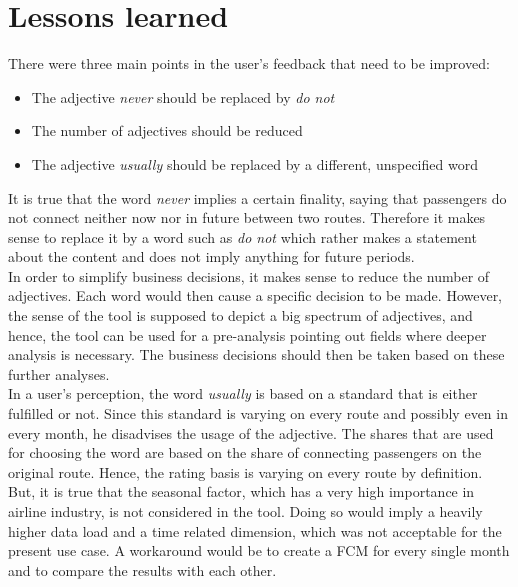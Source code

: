 \documentclass[conference]{IEEEtran}
\begin{document}
\section{Lessons learned}
\label{sec:lessons}
There were three main points in the user's feedback that need to be improved:
\begin{itemize}
\item The adjective \emph{never} should be replaced by \emph{do not}
\item The number of adjectives should be reduced
\item The adjective \emph{usually} should be replaced by a different, unspecified word
\end{itemize}
It is true that the word \emph{never} implies a certain finality, saying that passengers do not connect neither now nor in future between two routes. Therefore it makes sense to replace it by a word such as \emph{do not} which rather makes a statement about the content and does not imply anything for future periods.\\
In order to simplify business decisions, it makes sense to reduce the number of adjectives. Each word would then cause a specific decision to be made. However, the sense of the tool is supposed to depict a big spectrum of adjectives, and hence, the tool can be used for a pre-analysis pointing out fields where deeper analysis is necessary. The business decisions should then be taken based on these further analyses.\\
In a user's perception, the word \emph{usually} is based on a standard that is either fulfilled or not. Since this standard is varying on every route and possibly even in every month, he disadvises the usage of the adjective. The shares that are used for choosing the word are based on the share of connecting passengers on the original route. Hence, the rating basis is varying on every route by definition. But, it is true that the seasonal factor, which has a very high importance in airline industry, is not considered in the tool. Doing so would imply a heavily higher data load and a time related dimension, which was not acceptable for the present use case. A workaround would be to create a FCM for every single month and to compare the results with each other.
\end{document}
